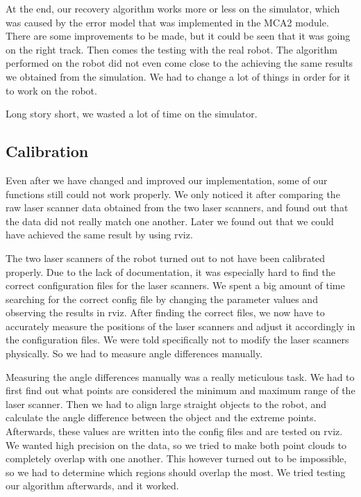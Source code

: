 At the end, our recovery algorithm works more or less on the simulator, which was caused by the error model that was implemented in the MCA2 module. There are some improvements to be made, but it could be seen that it was going on the right track. Then comes the testing with the real robot. The algorithm performed on the robot did not even come close to the achieving the same results we obtained from the simulation. We had to change a lot of things in order for it to work on the robot.

Long story short, we wasted a lot of time on the simulator.


\subsection{Calibration}

Even after we have changed and improved our implementation, some of our functions still could not work properly. We only noticed it after comparing the raw laser scanner data obtained from the two laser scanners, and found out that the data did not really match one another. Later we found out that we could have achieved the same result by using rviz.

The two laser scanners of the robot turned out to not have been calibrated properly. Due to the lack of documentation, it was especially hard to find the correct configuration files for the laser scanners. We spent a big amount of time searching for the correct config file by changing the parameter values and observing the results in rviz. After finding the correct files, we now have to accurately measure the positions of the laser scanners and adjust it accordingly in the configuration files. We were told specifically not to modify the laser scanners physically. So we had to measure angle differences manually.

Measuring the angle differences manually was a really meticulous task. We had to first find out what points are considered the minimum and maximum range of the laser scanner. Then we had to align large straight objects to the robot, and calculate the angle difference between the object and the extreme points. Afterwards, these values are written into the config files and are tested on rviz. We wanted high precision on the data, so we tried to make both point clouds to completely overlap with one another. This however turned out to be impossible, so we had to determine which regions should overlap the most. We tried testing our algorithm afterwards, and it worked.

